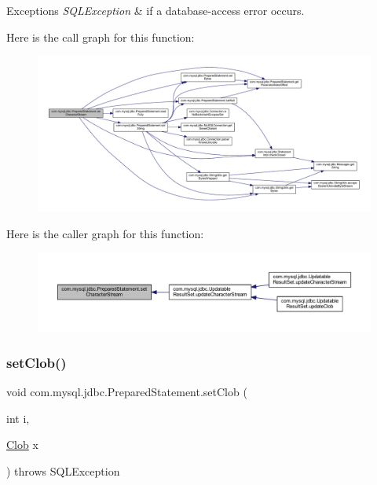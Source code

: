 \begin{DoxyExceptions}{Exceptions}
{\em S\+Q\+L\+Exception} & if a database-\/access error occurs. \\
\hline
\end{DoxyExceptions}
Here is the call graph for this function\+:
\nopagebreak
\begin{figure}[H]
\begin{center}
\leavevmode
\includegraphics[width=350pt]{classcom_1_1mysql_1_1jdbc_1_1_prepared_statement_a3653eef6d3825664b0dd3f0adbe8288c_cgraph}
\end{center}
\end{figure}
Here is the caller graph for this function\+:
\nopagebreak
\begin{figure}[H]
\begin{center}
\leavevmode
\includegraphics[width=350pt]{classcom_1_1mysql_1_1jdbc_1_1_prepared_statement_a3653eef6d3825664b0dd3f0adbe8288c_icgraph}
\end{center}
\end{figure}
\mbox{\label{classcom_1_1mysql_1_1jdbc_1_1_prepared_statement_afede5384371c1526e48fe4a923bc2292}} 
\subsubsection{\texorpdfstring{set\+Clob()}{setClob()}}
{\footnotesize\ttfamily void com.\+mysql.\+jdbc.\+Prepared\+Statement.\+set\+Clob (\begin{DoxyParamCaption}\item[{int}]{i,  }\item[{\mbox{\hyperlink{classcom_1_1mysql_1_1jdbc_1_1_clob}{Clob}}}]{x }\end{DoxyParamCaption}) throws S\+Q\+L\+Exception}

